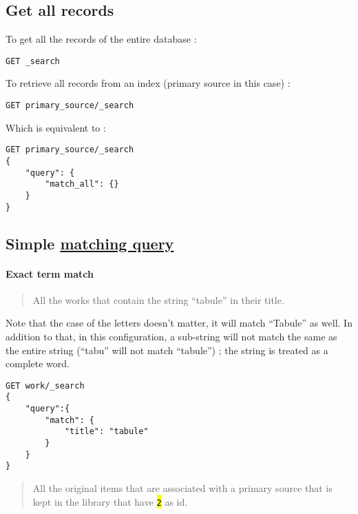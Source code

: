\documentclass[a4paper,12pt]{article}
\let\OldTexttt\texttt
\renewcommand{\texttt}[1]{\OldTexttt{\hl{#1}}}
\begin{document}
\subsection{Get all records}\label{get-all-records}

To get all the records of the entire database :

\begin{lstlisting}
GET _search
\end{lstlisting}

To retrieve all records from an index (primary source in this case) :

\begin{lstlisting}
GET primary_source/_search
\end{lstlisting}

Which is equivalent to :

\begin{lstlisting}
GET primary_source/_search
{
	"query": {
		"match_all": {}
	}
}
\end{lstlisting}

\subsection{Simple \href{https://www.elastic.co/guide/en/elasticsearch/reference/current/query-dsl-match-query.html}{matching query}}\label{simple-matching-query}

\paragraph{Exact term match}\label{exact-term-match}

\begin{quote}
All the works that contain the string ``tabule'' in their title.
\end{quote}

Note that the case of the letters doesn't matter, it will match ``Tabule'' as well. In addition to that, in this configuration, a sub-string will not match the same as the entire string (``tabu'' will not match ``tabule'') ; the string is treated as a complete word.

\begin{lstlisting}
GET work/_search
{
    "query":{
        "match": {
            "title": "tabule"
        }
    }
}
\end{lstlisting}

\begin{quote}
All the original items that are associated with a primary source that is kept in the library that have \texttt{2} as id.
\end{quote}
\end{document}
